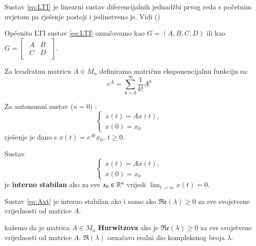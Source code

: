 \begin{rem}
    Sustav \eqref{eq:LTI} je linearni sustav diferencijalnih jednadžbi prvog reda s početnim uvjetom pa rješenje postoji i jedinstveno je. Vidi (\cite{ODJ})
\end{rem}
\begin{rem}
    Općenito LTI sustav \eqref{eq:LTI} označavamo kao $G = (A,B,C,D)$ ili kao 
    $G = \begin{bmatrix}
        \begin{array}{c|c}
           A & B \\
          \hline
          C & D
        \end{array}
    \end{bmatrix}$.
\end{rem}
\begin{defn}
    Za kvadratnu matricu $A \in M_n$ definiramo matričnu eksponencijalnu funkciju sa:
    $$e^A = \sum \limits_{k = 0}^{\infty} \frac{1}{k!} A^k$$
\end{defn}
\begin{prop}
    Za autonomni sustav ($u = 0$) :
    \begin{equation}
        \begin{cases}
            \dot{x}(t) = Ax(t),\\
            x(0) = x_0
        \end{cases}
        \label{eq:Axt}
    \end{equation}
    rješenje je dano s $x(t) = e^{At}x_0, \: t \geq 0.$
\end{prop}
\begin{defn}
    Sustav \begin{equation*}
        \begin{cases}
            \dot{x}(t) = Ax(t),\\
            x(0) = x_0
        \end{cases}
    \end{equation*} je \textbf{interno stabilan} ako za sve $x_0 \in \mathbb{R}^n$ vrijedi $\lim_{t \to \infty}x(t)=0$.
\end{defn}
\begin{prop}
    Sustav \eqref{eq:Axt} je interno stabilan ako i samo ako $\mathfrak{Re}(\lambda) \geq 0$ za sve svojstvene vrijednosti od matrice $A$.
\end{prop}

\begin{defn}
    kažemo da je matrica $A \in M_n$  \textbf{Hurwitzova} ako je $\mathfrak{Re}(\lambda) \geq 0$ za sve svojstvene vrijednosti od matrice $A$. $\Re(\lambda)$ označava realni dio kompleksnog broja $\lambda$.
\end{defn}

